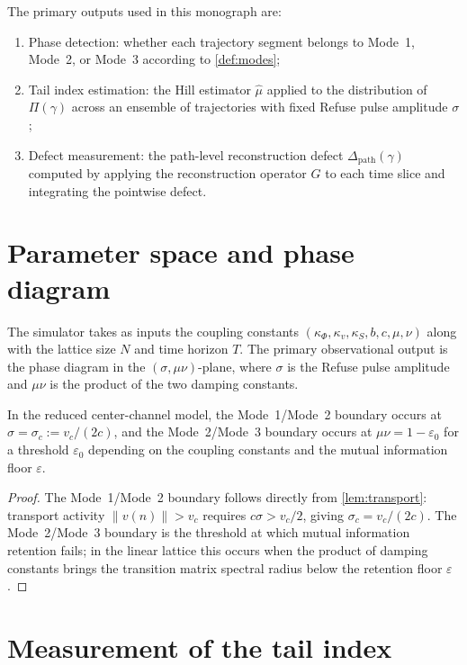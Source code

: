 \documentclass[12pt, oneside]{memoir}
\newcommand{\Dpth}{\Delta_{\mathrm{path}}}
\newcommand{\nnorm}[1]{\lVert #1 \rVert}
\begin{document}
The primary outputs used in this monograph are:
\begin{enumerate}
  \item Phase detection: whether each trajectory segment belongs to Mode~1, Mode~2, or
        Mode~3 according to \cref{def:modes};
  \item Tail index estimation: the Hill estimator $\hat\mu$ applied to the distribution
        of $\Pi(\gamma)$ across an ensemble of trajectories with fixed Refuse pulse
        amplitude $\sigma$;
  \item Defect measurement: the path-level reconstruction defect $\Dpth(\gamma)$ computed
        by applying the reconstruction operator $G$ to each time slice and integrating
        the pointwise defect.
\end{enumerate}

\section{Parameter space and phase diagram}

The simulator takes as inputs the coupling constants $(\kappa_\Phi, \kappa_v, \kappa_S,
b, c, \mu, \nu)$ along with the lattice size $N$ and time horizon $T$.  The primary
observational output is the phase diagram in the $(\sigma, \mu\nu)$-plane, where $\sigma$
is the Refuse pulse amplitude and $\mu\nu$ is the product of the two damping constants.

\begin{proposition}
\label{prop:phase-boundary}
In the reduced center-channel model, the Mode~1/Mode~2 boundary occurs at $\sigma =
\sigma_c := v_c/(2c)$, and the Mode~2/Mode~3 boundary occurs at $\mu\nu = 1 -
\varepsilon_0$ for a threshold $\varepsilon_0$ depending on the coupling constants and
the mutual information floor $\varepsilon$.
\end{proposition}

\begin{proof}
The Mode~1/Mode~2 boundary follows directly from \cref{lem:transport}: transport
activity $\nnorm{v(n)} > v_c$ requires $c\sigma > v_c/2$, giving $\sigma_c = v_c/(2c)$.
The Mode~2/Mode~3 boundary is the threshold at which mutual information retention fails;
in the linear lattice this occurs when the product of damping constants brings the
transition matrix spectral radius below the retention floor $\varepsilon$.
\end{proof}

\section{Measurement of the tail index}
\end{document}
